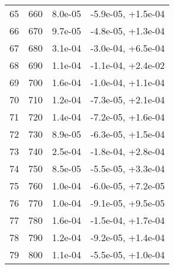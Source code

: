 \begin{table}
\begin{adjustbox}{width=1\textwidth/2}
\begin{tabular}{|c|c|c|c|}
\cline{1-4}
65 & 660 & 8.0e-05 & -5.9e-05, +1.5e-04 \\
\cline{1-4}
66 & 670 & 9.7e-05 & -4.8e-05, +1.3e-04 \\
\cline{1-4}
67 & 680 & 3.1e-04 & -3.0e-04, +6.5e-04 \\
\cline{1-4}
68 & 690 & 1.1e-04 & -1.1e-04, +2.4e-02 \\
\cline{1-4}
69 & 700 & 1.6e-04 & -1.0e-04, +1.1e-04 \\
\cline{1-4}
70 & 710 & 1.2e-04 & -7.3e-05, +2.1e-04 \\
\cline{1-4}
71 & 720 & 1.4e-04 & -7.2e-05, +1.6e-04 \\
\cline{1-4}
72 & 730 & 8.9e-05 & -6.3e-05, +1.5e-04 \\
\cline{1-4}
73 & 740 & 2.5e-04 & -1.8e-04, +2.8e-04 \\
\cline{1-4}
74 & 750 & 8.5e-05 & -5.5e-05, +3.3e-04 \\
\cline{1-4}
75 & 760 & 1.0e-04 & -6.0e-05, +7.2e-05 \\
\cline{1-4}
76 & 770 & 1.0e-04 & -9.1e-05, +9.5e-05 \\
\cline{1-4}
77 & 780 & 1.6e-04 & -1.5e-04, +1.7e-04 \\
\cline{1-4}
78 & 790 & 1.2e-04 & -9.2e-05, +1.4e-04 \\
\cline{1-4}
79 & 800 & 1.1e-04 & -5.5e-05, +1.0e-04 \\
\cline{1-4}
\end{tabular}
\end{adjustbox}
\end{table}

